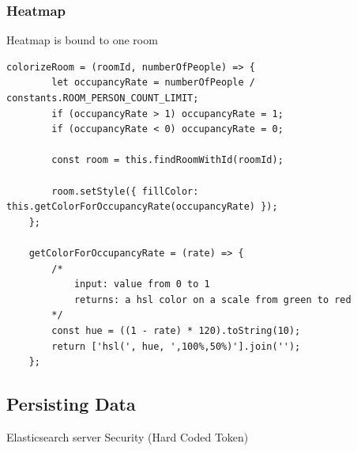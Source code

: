 \subsubsection{Heatmap}

Heatmap is bound to one room



\begin{lstlisting}[label=colorizeRoom]
	colorizeRoom = (roomId, numberOfPeople) => {
        let occupancyRate = numberOfPeople / constants.ROOM_PERSON_COUNT_LIMIT;
        if (occupancyRate > 1) occupancyRate = 1;
        if (occupancyRate < 0) occupancyRate = 0;

        const room = this.findRoomWithId(roomId);

        room.setStyle({ fillColor: this.getColorForOccupancyRate(occupancyRate) });
    };
    
    getColorForOccupancyRate = (rate) => {
        /*
            input: value from 0 to 1
            returns: a hsl color on a scale from green to red
        */
        const hue = ((1 - rate) * 120).toString(10);
        return ['hsl(', hue, ',100%,50%)'].join('');
    };
\end{lstlisting}

\subsection{Persisting Data}
\label{Persisting Data}

Elasticsearch server
Security (Hard Coded Token)

\clearpage
